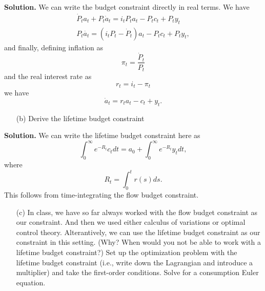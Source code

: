 \documentclass[11pt]{extarticle}
\theoremstyle{plain}
\theoremstyle{definition}
\begin{document}
\vspace{5mm}
\noindent
\textbf{Solution.} We can write the budget constraint directly in real terms. We have
\begin{gather*}
	\dot{P}_t a_t + P_t \dot{a}_t  = i_t P_t a_t - P_t c_t + P_t y_t \\
	P_t \dot{a_t} = (i_t P_t - \dot{P}_t) a_t - P_t c_t + P_t y_t,
\end{gather*}
and finally, defining inflation as 
\begin{equation}
	\pi_t = \frac{\dot{P}_t}{P_t}
\end{equation}
and the real interest rate as 
\begin{equation}
	r_t = i_t - \pi_t
\end{equation}
we have
\begin{equation}
	\dot{a}_t = r_t a_t - c_t + y_t. 
\end{equation}



\vspace{5mm}
\begin{enumerate}
	\item [(b)] Derive the lifetime budget constraint
\end{enumerate}

\vspace{5mm}
\noindent
\textbf{Solution.} We can write the lifetime budget constraint here as 
\begin{equation*}
	\int_0^\infty e^{-R_t} c_t dt = a_0 + \int_0^\infty e^{-R_t} y_t dt,
\end{equation*}
where 
\begin{equation*}
	R_t = \int_0^t r(s) ds. 
\end{equation*}
This follows from time-integrating the flow budget constraint. 


\vspace{5mm}
\begin{enumerate}
	\item [(c)] In class, we have so far always worked with the flow budget constraint as our constraint. And then we used either calculus of variations or optimal control theory. Alterantively, we can use the lifetime budget constraint as our constraint in this setting. (Why? When would you not be able to work with a lifetime budget constraint?) Set up the optimization problem with the lifetime budget constraint (i.e., write down the Lagrangian and introduce a multiplier) and take the first-order conditions. Solve for a consumption Euler equation. 
\end{enumerate}
\end{document}
